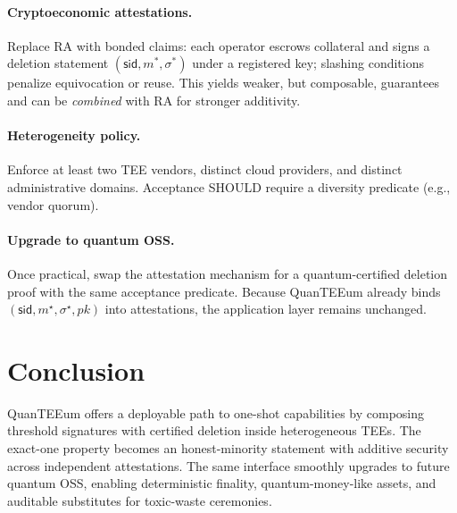 \documentclass[runningheads,orivec]{llncs}
\newcommand{\prot}{\textsf{QuanTEEum}}
\newcommand{\sid}{\mathsf{sid}}
\begin{document}
\paragraph{Cryptoeconomic attestations.}
Replace RA with bonded claims: each operator escrows collateral and signs a deletion statement $(\sid,m^{*},\sigma^{*})$ under a registered key; slashing conditions penalize equivocation or reuse. This yields weaker, but composable, guarantees and can be \emph{combined} with RA for stronger additivity.

\paragraph{Heterogeneity policy.}
Enforce at least two TEE vendors, distinct cloud providers, and distinct administrative domains. Acceptance SHOULD require a diversity predicate (e.g., vendor quorum).

\paragraph{Upgrade to quantum OSS.}
Once practical, swap the attestation mechanism for a quantum-certified deletion proof with the same acceptance predicate. Because \prot{} already binds $(\mathsf{sid},m^{\star},\sigma^{\star},pk)$ into attestations, the application layer remains unchanged.

\section{Conclusion}
\prot{} offers a deployable path to one-shot capabilities by composing threshold signatures with certified deletion inside heterogeneous TEEs. The exact-one property becomes an honest-minority statement with additive security across independent attestations. The same interface smoothly upgrades to future quantum OSS, enabling deterministic finality, quantum-money-like assets, and auditable substitutes for toxic-waste ceremonies.



\end{document}
